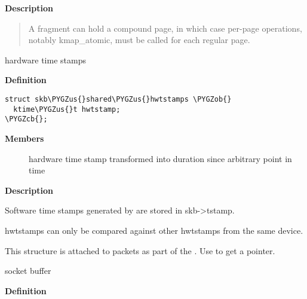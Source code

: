 \documentclass[a4paper,8pt,english]{sphinxmanual}
\def\PYGZus{\char`\_}
\def\PYGZob{\char`\{}
\def\PYGZcb{\char`\}}
\begin{document}
\textbf{Description}
\begin{quote}

A fragment can hold a compound page, in which case per-page
operations, notably kmap\_atomic, must be called for each
regular page.
\end{quote}

\begin{fulllineitems}
\label{networking/kapi:c.skb_shared_hwtstamps}
hardware time stamps

\end{fulllineitems}


\textbf{Definition}

\begin{Verbatim}[commandchars=\\\{\}]
struct skb\PYGZus{}shared\PYGZus{}hwtstamps \PYGZob{}
  ktime\PYGZus{}t hwtstamp;
\PYGZcb{};
\end{Verbatim}

\textbf{Members}
\begin{description}
\item[{}] \leavevmode
hardware time stamp transformed into duration
since arbitrary point in time

\end{description}

\textbf{Description}

Software time stamps generated by  are stored in
skb-\textgreater{}tstamp.

hwtstamps can only be compared against other hwtstamps from
the same device.

This structure is attached to packets as part of the
. Use  to get a pointer.

\begin{fulllineitems}
\label{networking/kapi:c.sk_buff}
socket buffer

\end{fulllineitems}


\textbf{Definition}
\end{document}
